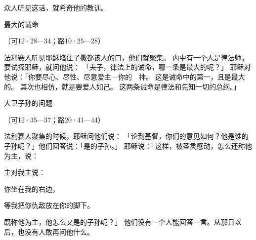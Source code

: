{众人听见这话，就希奇他的教训。
\par }{\SH 最大的诫命
\par }{\R （可12·28—34；路10·25—28）
\par }{\PP {}法利赛人听见耶稣堵住了撒都该人的口，他们就聚集。
内中有一个人是律法师，要试探耶稣，就问他说：
「夫子，律法上的诫命，哪一条是最大的呢？」
耶稣对他说：「你要尽心、尽性、尽意爱主—你的　神。
这是诫命中的第一，且是最大的。
其次也相仿，就是要爱人如己。
这两条诫命是律法和先知一切{}的总纲。」
\par }{\SH 大卫子孙的问题
\par }{\R （可12·35—37；路20·41—44）
\par }{\PP {}法利赛人聚集的时候，耶稣问他们说：
「论到基督，你们的意见如何？他是谁的子孙呢？」他们回答说：「是{}的子孙。」
耶稣说：「这样，{}被圣灵感动，怎么还称他为主，说：
\par }{\PP {}主对我主说：
\par }{\Q 你坐在我的右边，
\par }{\Q 等我把你仇敌放在你的脚下。
\par }{\MM {}既称他为主，他怎么又是{}的子孙呢？」
他们没有一个人能回答一言。从那日以后，也没有人敢再问他什么。

}
